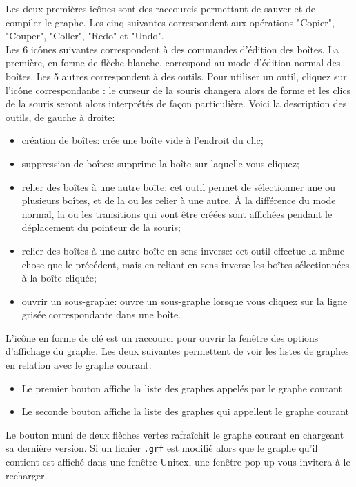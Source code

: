 \noindent Les deux premières icônes sont des raccourcis permettant de sauver et de compiler le
graphe. Les cinq suivantes correspondent aux opérations "Copier", "Couper", "Coller", "Redo" et
"Undo".\\

Les 6 icônes suivantes correspondent à des commandes d’édition des boîtes. La première,
en forme de flèche blanche, correspond au mode d’édition normal des boîtes. Les 5 autres
correspondent à des outils. Pour utiliser un outil, cliquez sur l’icône correspondante : le
curseur de la souris changera alors de forme et les clics de la souris seront alors interprétés
de façon particulière. Voici la description des outils, de gauche à droite:

\begin{itemize}
  \item création de boîtes: crée une boîte vide à l’endroit du clic;
  \item suppression de boîtes: supprime la boîte sur laquelle vous cliquez;
  \item relier des boîtes à une autre boîte: cet outil permet de sélectionner une ou plusieurs
boîtes, et de la ou les relier à une autre. À la différence du mode normal, la ou les
transitions qui vont être créées sont affichées pendant le déplacement du pointeur de
la souris;
  \item relier des boîtes à une autre boîte en sens inverse: cet outil effectue la même chose que
le précédent, mais en reliant en sens inverse les boîtes sélectionnées à la boîte cliquée;
  \item ouvrir un sous-graphe: ouvre un sous-graphe lorsque vous cliquez sur la ligne grisée
correspondante dans une boîte.
\end{itemize}

L'icône en forme de clé est un raccourci pour ouvrir la fenêtre des options d'affichage
du graphe. Les deux suivantes permettent de voir les listes de graphes en relation avec le
graphe courant:

\begin{itemize}
\item Le premier bouton affiche la liste des graphes appelés par le graphe courant
\item Le seconde bouton affiche la liste des graphes qui appellent le graphe courant
\end{itemize}

Le bouton muni de deux flèches vertes rafraîchit le graphe courant en chargeant sa dernière version.
Si un fichier \verb+.grf+ est modifié alors que le graphe qu'il contient est affiché dans
une fenêtre Unitex, une fenêtre pop up vous invitera à le recharger.

